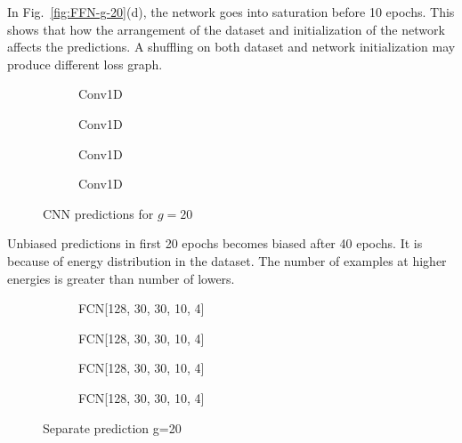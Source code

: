 \documentclass[a4paper,times,12pt]{article}
\begin{document}
In Fig.~\ref{fig:FFN-g-20}(d), the network goes into saturation before 10 epochs. This shows that how the arrangement of the dataset and initialization of the network affects the predictions. A shuffling  on both dataset and network initialization may produce different loss graph. 

\begin{figure}[H]
    \centering
    \begin{subfigure}[t]{0.45\textwidth}
		\centering
        
        \caption{Conv1D}
		\label{fig:a}
    \end{subfigure}
    \begin{subfigure}[t]{0.45\textwidth}
		\centering
        
        \caption{Conv1D}
		\label{fig:b}
    \end{subfigure}    
    \begin{subfigure}[t]{0.45\textwidth}
        \centering
        
        \caption{Conv1D}
		\label{fig:c}
    \end{subfigure}
    \begin{subfigure}[t]{0.45\textwidth}
        \centering
        
        \caption{Conv1D}
		\label{fig:d}
    \end{subfigure}
	\caption{CNN predictions for $g = 20$}
\label{fig:CNN-g-20}
\end{figure}

Unbiased predictions in first 20 epochs becomes biased after 40 epochs. It is because of energy distribution in the dataset. The number of examples at higher energies is greater than number of lowers. 

\begin{figure}[H]
    \centering
    \begin{subfigure}[t]{0.45\textwidth}
		\centering
        
        \caption{FCN[128, 30, 30, 10, 4]}
		\label{fig:a}
    \end{subfigure}
    \begin{subfigure}[t]{0.45\textwidth}
		\centering
        
        \caption{FCN[128, 30, 30, 10, 4]}
		\label{fig:b}
    \end{subfigure}    
    \begin{subfigure}[t]{0.45\textwidth}
        \centering
        
        \caption{FCN[128, 30, 30, 10, 4]}
		\label{fig:c}
    \end{subfigure}
    \begin{subfigure}[t]{0.45\textwidth}
        \centering
        
        \caption{FCN[128, 30, 30, 10, 4]}
		\label{fig:c}
    \end{subfigure}
	\caption{Separate prediction  g=20}
\label{fig:FFN-g-20-S}
\end{figure}
\end{document}
